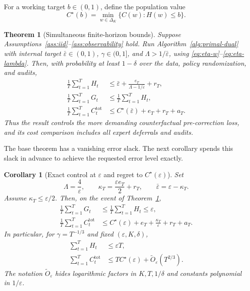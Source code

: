 \documentclass[11pt]{article}
\newtheorem{theorem}{Theorem}
\newtheorem{corollary}{Corollary}
\newcommand{\eps}{\varepsilon}
\newcommand{\simplex}{\Delta_K}
\begin{document}
For a working target $b\in(0,1)$, define the population value
\[
  C^\star(b)=\min_{w\in\simplex}\{C(w):H(w)\le b\}.
\]

\begin{theorem}[Simultaneous finite-horizon bounds]
\label{thm:main}
Suppose Assumptions~\ref{ass:iid}--\ref{ass:observability} hold.  Run
Algorithm~\ref{alg:primal-dual} with internal target $\bar\eps\in(0,1)$,
$\gamma\in(0,1]$, and $\Lambda>1/\bar\eps$, using
\eqref{eq:eta-w}--\eqref{eq:eta-lambda}.  Then, with probability at least
$1-\delta$ over the data, policy randomization, and audits,
\begin{align}
  \frac1T\sum_{t=1}^T H_t
  &\le
  \bar\eps
  +\frac{e_T}{\Lambda-1/\bar\eps}
  +r_T,
  \label{eq:main-H}\\
  \frac1T\sum_{t=1}^T G_t
  &\le
  \frac1T\sum_{t=1}^T H_t,
  \label{eq:main-G}\\
  \frac1T\sum_{t=1}^T C_t^{\mathrm{tot}}
  &\le
  C^\star(\bar\eps)+e_T+r_T+a_T.
  \label{eq:main-cost}
\end{align}
Thus the result controls the more demanding counterfactual pre-correction
loss, and its cost comparison includes all expert deferrals and audits.
\end{theorem}

The base theorem has a vanishing error slack.  The next corollary spends this
slack in advance to achieve the requested error level exactly.

\begin{corollary}[Exact control at $\eps$ and regret to $C^\star(\eps)$]
\label{cor:exact}
Set
\begin{equation}
  \Lambda=\frac{4}{\eps},
  \qquad
  \kappa_T=\frac{\eps e_T}{2}+r_T,
  \qquad
  \bar\eps=\eps-\kappa_T.
  \label{eq:tightening}
\end{equation}
Assume $\kappa_T\le\eps/2$.  Then, on the event of
Theorem~\ref{thm:main},
\begin{align}
  \frac1T\sum_{t=1}^T G_t
  &\le
  \frac1T\sum_{t=1}^T H_t
  \le\eps,
  \label{eq:exact-error}\\
  \frac1T\sum_{t=1}^T C_t^{\mathrm{tot}}
  &\le
  C^\star(\eps)
  +e_T+\frac{\kappa_T}{\eps}+r_T+a_T.
  \label{eq:exact-cost}
\end{align}
In particular, for $\gamma=T^{-1/3}$ and fixed
$(\eps,K,\delta)$,
\begin{align}
  \sum_{t=1}^T H_t&\le\eps T,\\
  \sum_{t=1}^T C_t^{\mathrm{tot}}
  &\le
  TC^\star(\eps)+\widetilde O_\eps(T^{2/3}).
  \label{eq:T23-summary}
\end{align}
The notation $\widetilde O_\eps$ hides logarithmic factors in
$K,T,1/\delta$ and constants polynomial in $1/\eps$.
\end{corollary}
\end{document}

